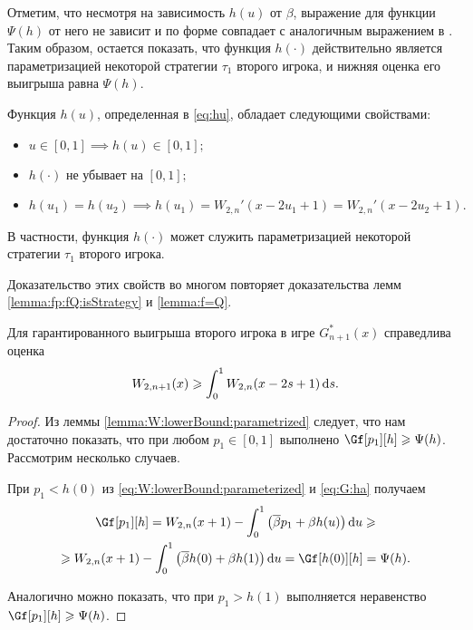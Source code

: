 {Отметим, что несмотря на зависимость $h(u)$ от $\beta$, выражение для функции $\Psi(h)$ от него не зависит и по форме совпадает с аналогичным выражением в \cite{demeyer02}.
Таким образом, остается показать, что функция $h(\cdot)$ действительно является параметризацией некоторой стратегии $\tau_1$ второго игрока, и нижняя оценка его выигрыша равна $\Psi(h)$.

\begin{lemma}\label{lemma:hu:props}
  Функция $h(u)$, определенная в \eqref{eq:hu}, обладает следующими свойствами:
  \begin{itemize}
  \item $u \in [0, 1] \implies h(u) \in [0, 1];$
  \item $h(\cdot)$ не убывает на $[0, 1];$
  \item $ h(u_1) = h(u_2) \implies h(u_1) = W_{2,n}'(x - 2u_1 + 1) = W_{2,n}'(x
    - 2u_2 + 1). $
  \end{itemize}
  В частности, функция $h(\cdot)$ может служить параметризацией некоторой стратегии $\tau_1$ второго игрока.
\end{lemma}
Доказательство этих свойств во многом повторяет доказательства лемм \ref{lemma:fp:fQ:isStrategy} и \ref{lemma:f=Q}.

\begin{theorem}\label{theorem:W:bound}
  Для гарантированного выигрыша второго игрока в игре $G_{n+1}^*(x)$ справедлива оценка
  \begin{equation*}
    W_{2,n+1}(x) \geqslant \int_0^1 W_{2,n}(x - 2s + 1) \mathop{}\!\mathrm{d} s.
  \end{equation*}
\end{theorem}
\begin{proof}
  Из леммы \ref{lemma:W:lowerBound:parametrized} следует, что нам достаточно показать, что при любом $p_1 \in [0, 1]$ выполнено $\Gf[p_1][h] \geqslant \Psi(h)$.
  Рассмотрим несколько случаев.

  При $p_1 < h(0)$ из \eqref{eq:W:lowerBound:parameterized} и \eqref{eq:G:ha} получаем
  \begin{multline*}
    \Gf[p_1][h] =
    W_{2,n}(x + 1) - \int_0^1 \left( \DCo p_1 + \Co h(u) \right) \di u \geqslant \\
    \geqslant W_{2,n}(x + 1) - \int_0^1 \left( \DCo h(0) + \Co h(1) \right) \di
    u = \Gf[h(0)][h] = \Psi(h).
  \end{multline*}

  Аналогично можно показать, что при $p_1 > h(1)$ выполняется неравенство $\Gf[p_1][h] \geqslant \Psi(h)$.


\end{proof}}
